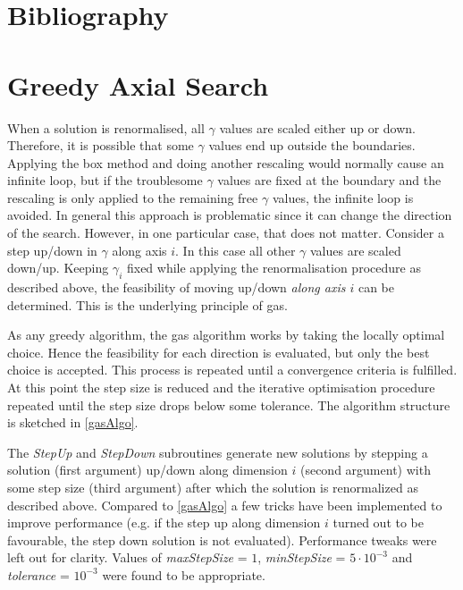 \documentclass[a4paper, 5p, sort&compress]{elsarticle}%
\begin{document}


\section*{Bibliography}



\appendix

\renewcommand{\thesection}{Appendix \Roman{section}}
\section{Greedy Axial Search}
\label{sec:greedy-axial-search}

When a solution is renormalised, all $\gamma$ values are scaled either up
or down. Therefore, it is possible that some $\gamma$ values end up outside
the boundaries. Applying the box method and doing another rescaling
would normally cause an infinite loop, but if the troublesome $\gamma$
values are fixed at the boundary and the rescaling is only applied to
the remaining free $\gamma$ values, the infinite loop is avoided. In
general this approach is problematic since it can change the direction
of the search. However, in one particular case, that does not
matter. Consider a step up/down in $\gamma$ along axis $i$. In this case
all other $\gamma$ values are scaled down/up. Keeping $\gamma_{i}$ fixed while
applying the renormalisation procedure as described above, the
feasibility of moving up/down \textit{along axis $i$} can be
determined. This is the underlying principle of \gls{gas}.

As any greedy algorithm, the \gls{gas} algorithm works by taking the
locally optimal choice. Hence the feasibility for each direction is
evaluated, but only the best choice is accepted. This process is
repeated until a convergence criteria is fulfilled. At this point the
step size is reduced and the iterative optimisation procedure repeated
until the step size drops below some tolerance. The algorithm
structure is sketched in \cref{gasAlgo}.

The \textit{StepUp} and \textit{StepDown} subroutines generate new
solutions by stepping a solution (first argument) up/down along
dimension $i$ (second argument) with some step size (third argument)
after which the solution is renormalized as described above. Compared
to \cref{gasAlgo} a few tricks have been implemented to improve
performance (e.g. if the step up along dimension $i$ turned out to be
favourable, the step down solution is not evaluated). Performance
tweaks were left out for clarity. Values of \textit{maxStepSize} =
$1$, \textit{minStepSize} = $5 \cdot 10^{-3}$ and \textit{tolerance} =
$10^{-3}$ were found to be appropriate.
\end{document}
